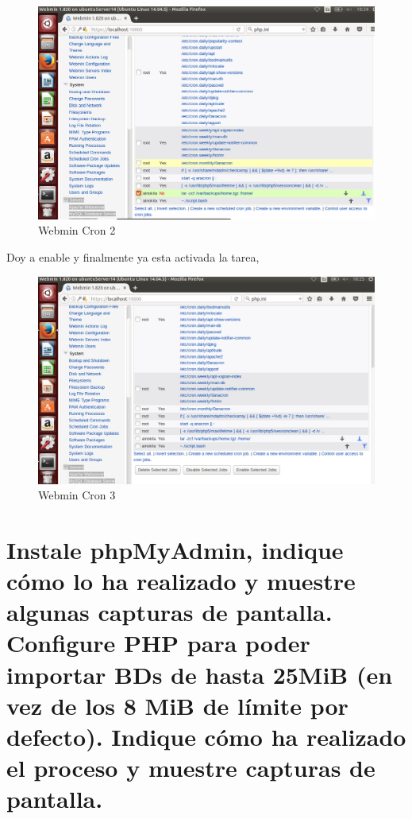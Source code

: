 	\begin{figure}[H]
	\centering
	\includegraphics[scale=0.35]{pics/cron2.png}
	\caption{Webmin Cron 2} \label{fig:web_cron2}
\end{figure}

Doy a enable y finalmente ya esta activada la tarea,

	\begin{figure}[H]
	\centering
	\includegraphics[scale=0.35]{pics/cron3.png}
	\caption{Webmin Cron 3} \label{fig:web_cron3}
	\end{figure}

\section[Cuestión 13]{Instale phpMyAdmin, indique cómo lo ha realizado y muestre algunas capturas de pantalla. Configure PHP para poder importar BDs de	hasta 25MiB (en vez de los 8 MiB de límite por defecto). Indique cómo ha realizado el proceso y muestre capturas de pantalla.}

